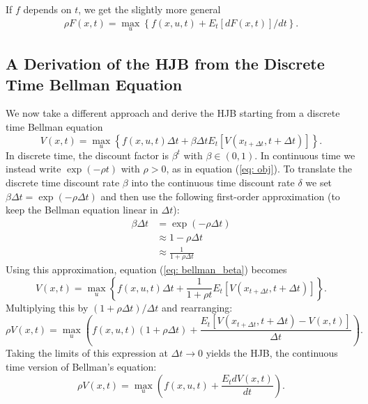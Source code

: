 \documentclass[\topdir/lecture\_notes.tex]{subfiles}
\begin{document}
If $f$ depends on $t$, we get the slightly more general
\begin{align}
\rho F(x,t) = \max_u \left\{ f(x,u,t) + E_t[dF(x,t)]/dt \right\}. \label{eq: hjb_t}
\end{align}


\subsection{A Derivation of the HJB from the Discrete Time Bellman Equation}
We now take a different approach and derive the HJB starting from a discrete time Bellman equation
\begin{equation}
V(x, t)=\max_{u}\left\{f(x, u,t) \Delta t+ \beta \Delta t E_{t}[V\left(x_{t+\Delta t}, t+\Delta t\right)]\right\}. \label{eq: bellman_beta}
\end{equation}
In discrete time, the discount factor is $\beta^t$ with $\beta \in (0,1)$. In continuous time we instead write $\exp(-\rho t)$ with $\rho>0$, as in equation (\ref{eq: obj}). To translate the discrete time discount rate $\beta$ into the continuous time discount rate $\delta$ we set $\beta \Delta t = \exp(-\rho \Delta t)$ and then use the following first-order approximation (to keep the Bellman equation linear in $\Delta t$):
\begin{align*}
    \beta \Delta t &= \exp(-\rho \Delta t) \\
                  &\approx 1-\rho \Delta t \\
                  &\approx \frac{1}{1+\rho \Delta t} 
\end{align*}
Using this approximation, equation (\ref{eq: bellman_beta}) becomes
\begin{equation*}
V(x, t)=\max_{u}\left\{f(x, u,t) \Delta t+ \frac{1}{1+\rho t} E_{t}[V\left(x_{t+\Delta t}, t+\Delta t\right)]\right\}.
\end{equation*}
Multiplying this by $(1+\rho \Delta t) / \Delta t$ and rearranging:
\begin{equation*}
\rho V(x, t)=\max _{u}\left(f(x, u,t)(1+\rho \Delta t)+\frac{E_{t}\left[V\left(x_{t+\Delta t}, t+\Delta t\right)-V(x, t)\right]}{\Delta t}\right).
\end{equation*}
Taking the limits of this expression at $\Delta t \rightarrow 0$ yields the HJB, the continuous time version of Bellman's equation:
\begin{equation}
\rho V(x, t)=\max_{u}\left(f(x,u,t)+\frac{E_{t} dV(x, t)}{dt}\right). \label{eq: 10.2}
\end{equation}
\end{document}
